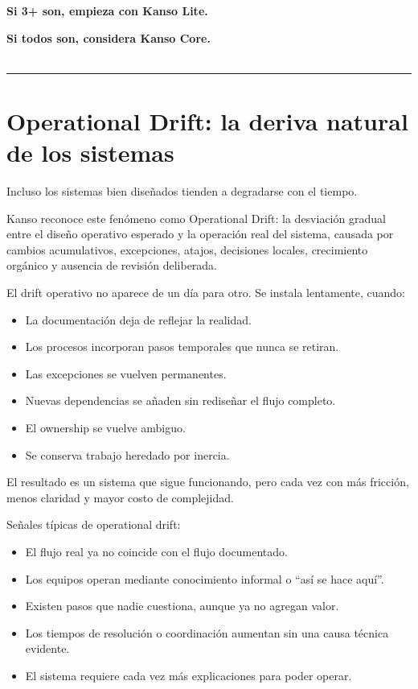 \textbf{Si 3+ son, empieza con Kanso Lite.}

\textbf{Si todos son, considera Kanso Core.}
\\
\\

\hrule
\section{Operational Drift: la deriva natural de los sistemas}

Incluso los sistemas bien diseñados tienden a degradarse con el tiempo.

Kanso reconoce este fenómeno como Operational Drift: la desviación gradual entre el diseño operativo esperado y 
la operación real del sistema, causada por cambios acumulativos, excepciones, atajos, decisiones locales, 
crecimiento orgánico y ausencia de revisión deliberada.

El drift operativo no aparece de un día para otro. Se instala lentamente, cuando:
\begin{itemize}
	\item La documentación deja de reflejar la realidad.
	\item Los procesos incorporan pasos temporales que nunca se retiran.
	\item Las excepciones se vuelven permanentes.
	\item Nuevas dependencias se añaden sin rediseñar el flujo completo.
	\item El ownership se vuelve ambiguo.
	\item Se conserva trabajo heredado por inercia.
\end{itemize}

El resultado es un sistema que sigue funcionando, pero cada vez con más fricción, menos claridad y mayor costo de complejidad.

Señales típicas de operational drift:
\begin{itemize}
	\item El flujo real ya no coincide con el flujo documentado.
	\item Los equipos operan mediante conocimiento informal o “así se hace aquí”.
	\item Existen pasos que nadie cuestiona, aunque ya no agregan valor.
	\item Los tiempos de resolución o coordinación aumentan sin una causa técnica evidente.
	\item El sistema requiere cada vez más explicaciones para poder operar.
\end{itemize}    


